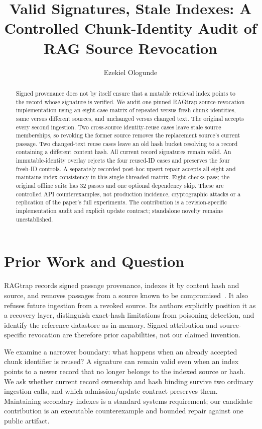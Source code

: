 \documentclass[sigconf,nonacm]{acmart}
\title{Valid Signatures, Stale Indexes: A Controlled Chunk-Identity Audit of RAG Source Revocation}
\author{Ezekiel Ologunde}
\begin{document}
\begin{abstract}
Signed provenance does not by itself ensure that a mutable retrieval index points to the record whose signature is verified. We audit one pinned RAGtrap source-revocation implementation using an eight-case matrix of repeated versus fresh chunk identities, same versus different sources, and unchanged versus changed text. The original accepts every second ingestion. Two cross-source identity-reuse cases leave stale source memberships, so revoking the former source removes the replacement source's current passage. Two changed-text reuse cases leave an old hash bucket resolving to a record containing a different content hash. All current record signatures remain valid. An immutable-identity overlay rejects the four reused-ID cases and preserves the four fresh-ID controls. A separately recorded post-hoc upsert repair accepts all eight and maintains index consistency in this single-threaded matrix. Eight checks pass; the original offline suite has 32 passes and one optional dependency skip. These are controlled API counterexamples, not production incidence, cryptographic attacks or a replication of the paper's full experiments. The contribution is a revision-specific implementation audit and explicit update contract; standalone novelty remains unestablished.
\end{abstract}
\maketitle

\section{Prior Work and Question}
RAGtrap records signed passage provenance, indexes it by content hash and source, and removes passages from a source known to be compromised~\cite{ragtrap}. It also refuses future ingestion from a revoked source. Its authors explicitly position it as a recovery layer, distinguish exact-hash limitations from poisoning detection, and identify the reference datastore as in-memory. Signed attribution and source-specific revocation are therefore prior capabilities, not our claimed invention.

We examine a narrower boundary: what happens when an already accepted chunk identifier is reused? A signature can remain valid even when an index points to a newer record that no longer belongs to the indexed source or hash. We ask whether current record ownership and hash binding survive two ordinary ingestion calls, and which admission/update contract preserves them. Maintaining secondary indexes is a standard systems requirement; our candidate contribution is an executable counterexample and bounded repair against one public artifact.
\end{document}
